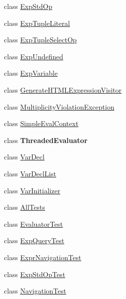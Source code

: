 \begin{DoxyCompactItemize}
\item 
class \hyperlink{classorg_1_1tzi_1_1use_1_1uml_1_1ocl_1_1expr_1_1_exp_std_op}{Exp\-Std\-Op}
\item 
class \hyperlink{classorg_1_1tzi_1_1use_1_1uml_1_1ocl_1_1expr_1_1_exp_tuple_literal}{Exp\-Tuple\-Literal}
\item 
class \hyperlink{classorg_1_1tzi_1_1use_1_1uml_1_1ocl_1_1expr_1_1_exp_tuple_select_op}{Exp\-Tuple\-Select\-Op}
\item 
class \hyperlink{classorg_1_1tzi_1_1use_1_1uml_1_1ocl_1_1expr_1_1_exp_undefined}{Exp\-Undefined}
\item 
class \hyperlink{classorg_1_1tzi_1_1use_1_1uml_1_1ocl_1_1expr_1_1_exp_variable}{Exp\-Variable}
\item 
class \hyperlink{classorg_1_1tzi_1_1use_1_1uml_1_1ocl_1_1expr_1_1_generate_h_t_m_l_expression_visitor}{Generate\-H\-T\-M\-L\-Expression\-Visitor}
\item 
class \hyperlink{classorg_1_1tzi_1_1use_1_1uml_1_1ocl_1_1expr_1_1_multiplicity_violation_exception}{Multiplicity\-Violation\-Exception}
\item 
class \hyperlink{classorg_1_1tzi_1_1use_1_1uml_1_1ocl_1_1expr_1_1_simple_eval_context}{Simple\-Eval\-Context}
\item 
class {\bfseries Threaded\-Evaluator}
\item 
class \hyperlink{classorg_1_1tzi_1_1use_1_1uml_1_1ocl_1_1expr_1_1_var_decl}{Var\-Decl}
\item 
class \hyperlink{classorg_1_1tzi_1_1use_1_1uml_1_1ocl_1_1expr_1_1_var_decl_list}{Var\-Decl\-List}
\item 
class \hyperlink{classorg_1_1tzi_1_1use_1_1uml_1_1ocl_1_1expr_1_1_var_initializer}{Var\-Initializer}
\item 
class \hyperlink{classorg_1_1tzi_1_1use_1_1uml_1_1ocl_1_1expr_1_1_all_tests}{All\-Tests}
\item 
class \hyperlink{classorg_1_1tzi_1_1use_1_1uml_1_1ocl_1_1expr_1_1_evaluator_test}{Evaluator\-Test}
\item 
class \hyperlink{classorg_1_1tzi_1_1use_1_1uml_1_1ocl_1_1expr_1_1_exp_query_test}{Exp\-Query\-Test}
\item 
class \hyperlink{classorg_1_1tzi_1_1use_1_1uml_1_1ocl_1_1expr_1_1_expr_navigation_test}{Expr\-Navigation\-Test}
\item 
class \hyperlink{classorg_1_1tzi_1_1use_1_1uml_1_1ocl_1_1expr_1_1_exp_std_op_test}{Exp\-Std\-Op\-Test}
\item 
class \hyperlink{classorg_1_1tzi_1_1use_1_1uml_1_1ocl_1_1expr_1_1_navigation_test}{Navigation\-Test}
\end{DoxyCompactItemize}
